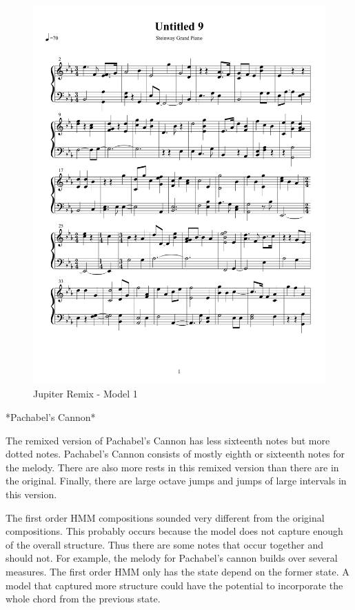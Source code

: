 \documentclass{article} %
\begin{document}
\begin{figure}[H]
\centering
\caption{Jupiter Remix - Model 1}
\includegraphics [scale = 0.6] {JupiterRemix-cropped.pdf}
\end{figure}

*Pachabel's Cannon*

The remixed version of Pachabel's Cannon has less sixteenth notes but more dotted notes. Pachabel's Cannon consists of mostly eighth or sixteenth notes for the melody. There are also more rests in this remixed version than there are in the original. Finally, there are large octave jumps and jumps of large intervals in this version.

The first order HMM compositions sounded very different from the original compositions. This probably occurs because the model does not capture enough of the overall structure. Thus there are some notes that occur together and should not. For example, the melody for Pachabel's cannon builds over several measures. The first order HMM only has the state depend on the former state. A model that captured more structure could have the potential to incorporate the whole chord from the previous state. 
\end{document}
